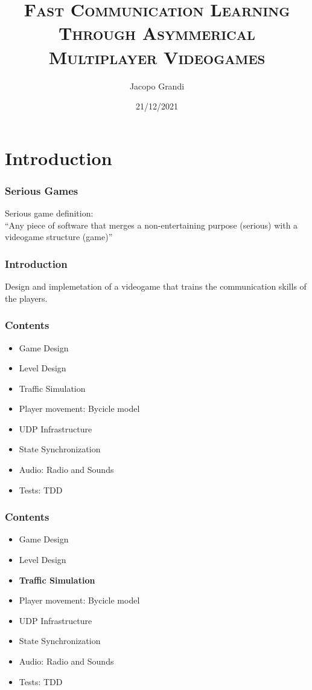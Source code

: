 \documentclass{beamer}
\title{\textsc{Fast Communication Learning Through Asymmerical Multiplayer Videogames} }
\date{21/12/2021}
\author{Jacopo Grandi}
\begin{document}
\begin{frame}
  \titlepage
\end{frame}


\section{Introduction}
\begin{frame}
\frametitle{Serious Games}
Serious game definition:\\
	``Any piece of software that merges a non-entertaining purpose (serious) with a videogame structure (game)''
\end{frame}

\begin{frame}
\frametitle{Introduction}
Design and implemetation of a videogame that trains the communication skills of the players.
\end{frame}

\begin{frame}
\frametitle{Contents}
	\begin{itemize}
		\item Game Design
		\item Level Design
		\item Traffic Simulation
		\item Player movement: Bycicle model
		\item UDP Infrastructure
		\item State Synchronization
		\item Audio: Radio and Sounds
		\item Tests: TDD
	\end{itemize}
\end{frame}

\begin{frame}
\frametitle{Contents}
	\begin{itemize}
		\item Game Design
		\item Level Design
		\item \textbf{Traffic Simulation}
		\item Player movement: Bycicle model
		\item UDP Infrastructure
		\item State Synchronization
		\item Audio: Radio and Sounds
		\item Tests: TDD
	\end{itemize}
\end{frame}
\end{document}
